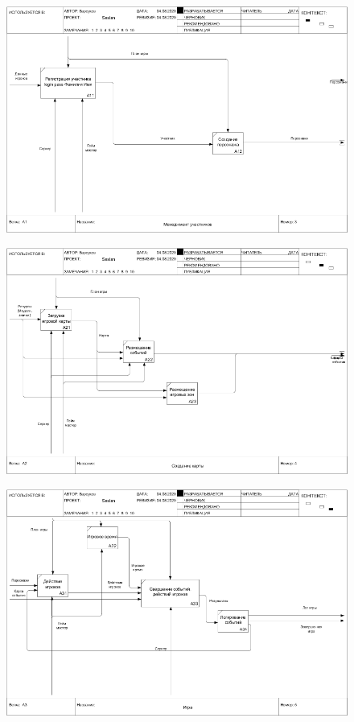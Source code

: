 	\begin{figure}[H]
		\centering
		\includegraphics[width=0.7\linewidth]{src/Idef0/03_A1}
		\caption{}
		\label{fig:03a1}
	\end{figure}
	
	\begin{figure}[H]
		\centering
		\includegraphics[width=0.7\linewidth]{src/Idef0/04_A2}
		\caption{}
		\label{fig:04a2}
	\end{figure}

	\begin{figure}[H]
		\centering
		\includegraphics[width=0.7\linewidth]{src/Idef0/05_A3}
		\caption{}
		\label{fig:05a3}
	\end{figure}
	
